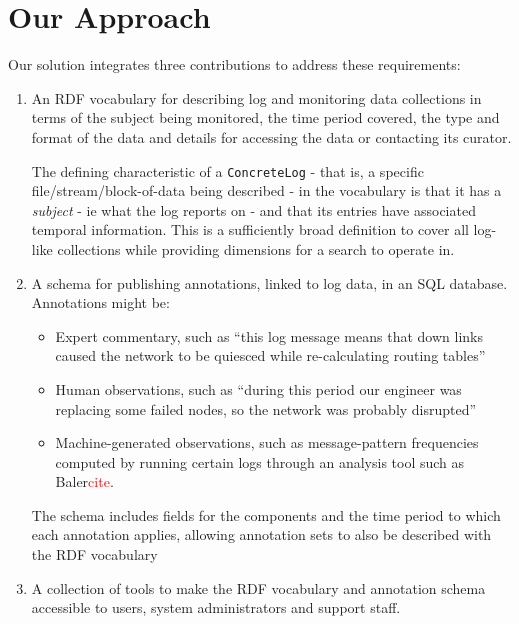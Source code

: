 \section{Our Approach}
\label{s:solution}

Our solution integrates three contributions to address these requirements:
\begin{enumerate}
\item An RDF vocabulary for describing log and monitoring data collections
      in terms of the subject being monitored, the time period covered,
      the type and format of the data and details for accessing the data or
      contacting its curator.
      
      The defining characteristic of a \texttt{ConcreteLog} - that is, a 
      specific file/stream/block-of-data being described - in the vocabulary
      is that it has a \emph{subject} - ie what the log reports on - and 
      that its entries have associated temporal information. This is a 
      sufficiently broad definition to cover all log-like collections
      while providing dimensions for a search to operate in.
      
\item A schema for publishing annotations, linked to log data, in an SQL
	  database. Annotations might be:
      
\begin{itemize}
\item Expert commentary, such as ``this log message means that down links
      caused the network to be quiesced while re-calculating routing tables''      
\item Human observations, such as ``during this period our engineer was 
      replacing some failed nodes, so the network was probably disrupted'' 
\item Machine-generated observations, such as message-pattern frequencies 
      computed by running certain logs through an analysis tool such as 
      Baler\textcolor{red}{cite}.
\end{itemize}

      The schema includes fields for the  components and the time period to 
      which each annotation applies, allowing annotation sets to also be 
      described with the RDF vocabulary

\item A collection of tools to make the RDF vocabulary and annotation 
      schema accessible to users, system administrators and support staff.


\end{enumerate}
